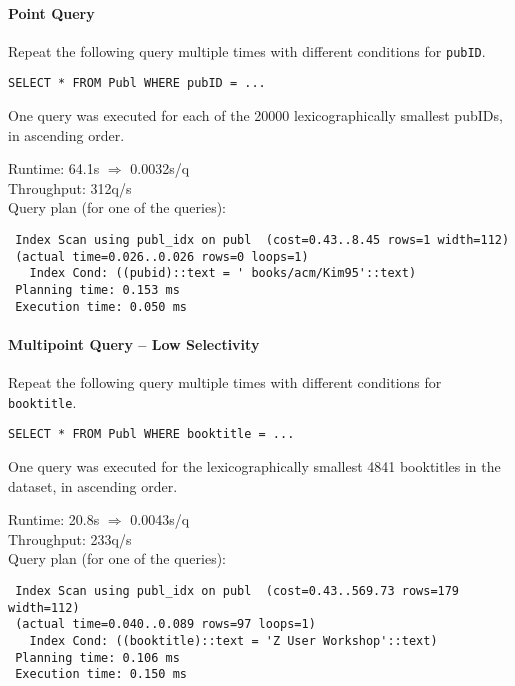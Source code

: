 \documentclass[11pt]{scrartcl}
\begin{document}
\paragraph{Point Query}

Repeat the following query multiple times with different conditions for {\tt pubID}.

{\small
\begin{verbatim}
SELECT * FROM Publ WHERE pubID = ...
\end{verbatim}
}

\noindent
\newcommand{\condA}[1][20000]{
One query was executed for each of the #1 lexicographically smallest pubIDs,
in ascending order.
}
\condA

\smallskip\noindent
Runtime: 64.1s $\Rightarrow$ 0.0032s/q\\
Throughput: 312q/s\\

\smallskip\noindent
Query plan (for one of the queries):
{\small
\begin{verbatim}
 Index Scan using publ_idx on publ  (cost=0.43..8.45 rows=1 width=112)
 (actual time=0.026..0.026 rows=0 loops=1)
   Index Cond: ((pubid)::text = ' books/acm/Kim95'::text)
 Planning time: 0.153 ms
 Execution time: 0.050 ms
\end{verbatim}
}

\paragraph{Multipoint Query -- Low Selectivity}

Repeat the following query multiple times with different conditions for {\tt booktitle}.

{\small
\begin{verbatim}
SELECT * FROM Publ WHERE booktitle = ...
\end{verbatim}
}

\noindent
\newcommand{\condB}[1][4841]{
One query was executed for the lexicographically smallest #1 booktitles in the dataset,
in ascending order.}
\condB

\smallskip\noindent
Runtime: 20.8s $\Rightarrow$ 0.0043s/q\\
Throughput: 233q/s\\

\smallskip\noindent
Query plan (for one of the queries):
{\small
\begin{verbatim}
 Index Scan using publ_idx on publ  (cost=0.43..569.73 rows=179 width=112)
 (actual time=0.040..0.089 rows=97 loops=1)
   Index Cond: ((booktitle)::text = 'Z User Workshop'::text)
 Planning time: 0.106 ms
 Execution time: 0.150 ms
\end{verbatim}
}
\end{document}
